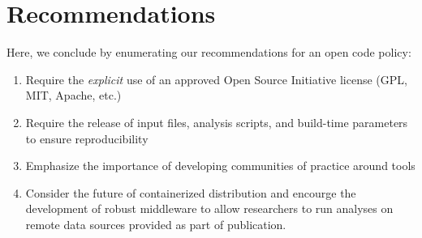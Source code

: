 \documentclass[12pt, titlepage]{aastex62}
\begin{document}
\section{Recommendations}
\label{sec:recommendations}
Here, we conclude by enumerating our recommendations for an open code policy:
\begin{enumerate}
\item Require the \emph{explicit} use of an approved Open Source Initiative license (GPL, MIT, Apache, etc.)
\item Require the release of input files, analysis scripts, and build-time parameters to ensure reproducibility
\item Emphasize the importance of developing communities of practice around tools
\item Consider the future of containerized distribution and encourge the development of robust middleware to allow researchers to run analyses on remote data sources provided as part of publication.
\end{enumerate}

{\footnotesize
%

}
\end{document}
